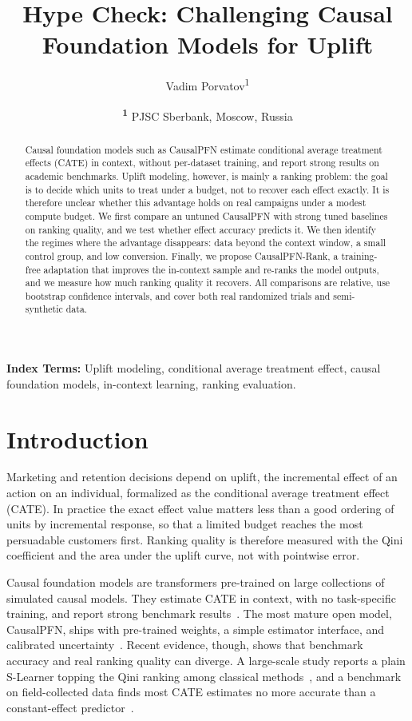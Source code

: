 \documentclass[twocolumn]{style}
\title{Hype Check: Challenging Causal Foundation Models for Uplift}
\author{
    Vadim Porvatov\textsuperscript{1}
}
\date{
    \textsuperscript{\textbf{1}}
    PJSC Sberbank, Moscow, Russia
}
\begin{document}
\twocolumn[\maketitle]
\small

\begin{abstract}
    \noindent Causal foundation models such as CausalPFN estimate conditional average treatment
    effects (CATE) in context, without per-dataset training, and report strong results on academic
    benchmarks. Uplift modeling, however, is mainly a ranking problem: the goal is to decide which
    units to treat under a budget, not to recover each effect exactly. It is therefore unclear
    whether this advantage holds on real campaigns under a modest compute budget. We first compare
    an untuned CausalPFN with strong tuned baselines on ranking quality, and we test whether effect
    accuracy predicts it. We then identify the regimes where the advantage disappears: data beyond
    the context window, a small control group, and low conversion. Finally, we propose
    CausalPFN-Rank, a training-free adaptation that improves the in-context sample and re-ranks the
    model outputs, and we measure how much ranking quality it recovers. All comparisons are
    relative, use bootstrap confidence intervals, and cover both real randomized trials and
    semi-synthetic data.
\end{abstract}

\noindent\small{\textbf{Index Terms:} Uplift modeling, conditional average treatment effect,
causal foundation models, in-context learning, ranking evaluation.}

\section{Introduction}
Marketing and retention decisions depend on uplift, the incremental effect of an action on an
individual, formalized as the conditional average treatment effect (CATE). In practice the exact
effect value matters less than a good ordering of units by incremental response, so that a limited
budget reaches the most persuadable customers first. Ranking quality is therefore measured with the
Qini coefficient and the area under the uplift curve, not with pointwise error.

Causal foundation models are transformers pre-trained on large collections of simulated causal
models. They estimate CATE in context, with no task-specific training, and report strong benchmark
results~\cite{balazadeh2025causalpfn, robertson2025dopfn, causalfm2025}. The most mature open model,
CausalPFN, ships with pre-trained weights, a simple estimator interface, and calibrated
uncertainty~\cite{balazadeh2025causalpfn}. Recent evidence, though, shows that benchmark accuracy
and real ranking quality can diverge. A large-scale study reports a plain S-Learner topping the Qini
ranking among classical methods~\cite{singh2026criteobench}, and a benchmark on field-collected data
finds most CATE estimates no more accurate than a constant-effect predictor~\cite{yu2024cate}.
\end{document}
